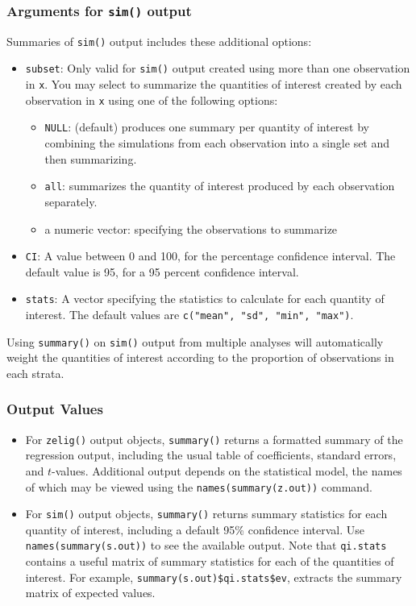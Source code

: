 \subsubsection{Arguments for {\tt sim()} output}
Summaries of {\tt sim()} output includes these additional options:
   \begin{itemize}
     \item {\tt subset}:  Only valid for {\tt sim()} output created
       using more than one observation in {\tt x}.  You may select to
       summarize the quantities of interest created by each
       observation in {\tt x} using one of the following options: 
       \begin{itemize}
       \item {\tt NULL}: (default) produces one summary per quantity
         of interest by combining the simulations from each
         observation into a single set and then summarizing.
         \item {\tt all}:  summarizes the quantity of interest
           produced by each observation separately.  
         \item a numeric vector: specifying the observations to summarize 
       \end{itemize}
     \item {\tt CI}: A value between 0 and 100, for the percentage
       confidence interval.  The default value is 95, for a 95 percent
       confidence interval.  
     \item {\tt stats}: A vector specifying the statistics to
       calculate for each quantity of interest.  The default values
       are {\tt c("mean", "sd", "min", "max")}.  
   \end{itemize}
Using {\tt summary()} on {\tt sim()} output from multiple analyses
will automatically weight the quantities of interest according to the
proportion of observations in each strata.  

\subsubsection{Output Values}
\begin{itemize}
\item For {\tt zelig()} output objects, {\tt summary()} returns a
  formatted summary of the regression output, including the usual
  table of coefficients, standard errors, and $t$-values.  Additional
  output depends on the statistical model, the names of which may
  be viewed using the {\tt names(summary(z.out))} command.
\item For {\tt sim()} output objects, {\tt summary()} returns summary
  statistics for each quantity of interest, including a default 95\%
  confidence interval.  Use {\tt names(summary(s.out))} to see the
  available output.  Note that {\tt qi.stats} contains a useful matrix
  of summary statistics for each of the quantities of interest.  For
  example, {\tt summary(s.out)\$qi.stats\$ev}, extracts the summary
  matrix of expected values.
\end{itemize}

